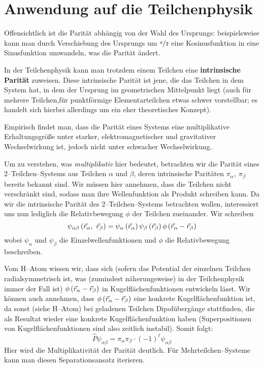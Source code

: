 \documentclass[Ex4_Zusammenfassung.tex]{subfiles}
\begin{document}
\section{Anwendung auf die Teilchenphysik}
Offensichtlich ist die Parität abhängig von der Wahl des Ursprungs: beispielsweise kann man durch Verschiebung des Ursprungs um $\nicefrac{\pi}{2}$ eine Kosinusfunktion in eine Sinusfunktion umwandeln, was die Parität ändert. 

In der Teilchenphysik kann man trotzdem einem Teilchen eine \textbf{intrinsische Parität} zuweisen. Diese intrinsische Parität ist jene, die das Teilchen in dem System hat, in dem der Ursprung im geometrischen Mittelpunkt liegt (auch für mehrere Teilchen,für punktförmige Elementarteilchen etwas schwer vorstellbar; es handelt sich hierbei allerdings um ein eher theoretisches Konzept). 

Empirisch findet man, dass die Parität eines Systems eine multiplikative Erhaltungsgröße unter starker, elektromagnetischer und gravitativer Wechselwirkung ist, jedoch nicht unter schwacher Wechselwirkung. 

Um zu verstehen, was \textit{multiplikativ} hier bedeutet, betrachten wir die Parität eines 2--Teilchen--Systems aus Teilchen $\alpha$ und $\beta$, deren intrinsische Paritäten $\pi_\alpha,\ \pi_\beta$ bereits bekannt sind. Wir müssen hier annehmen, dass die Teilchen nicht verschränkt sind, sodass man ihre Wellenfunktion als Produkt schreiben kann. Da wir die intrinsische Parität des 2--Teilchen--Systems betrachten wollen, interessiert uns nun lediglich die Relativbewegung $\phi$ der Teilchen zueinander. Wir schreiben
\begin{equation}
	\psi_{\alpha \beta} \lp \vec{r}_\alpha ,\ \vec{r}_\beta \rp = \psi_\alpha \lp \vec{r}_\alpha \rp \psi_\beta \lp \vec{r}_\beta \rp \phi \lp \vec{r}_\alpha - \vec{r}_\beta\rp
\end{equation}
wobei $\psi_\alpha$ und $\psi_\beta$ die Einzelwellenfunktionen und $\phi$ die Relativbewegung beschreiben. 

Vom H--Atom wissen wir, dass sich (sofern das Potential der einzelnen Teilchen radialsymmetrisch ist, was (zumindest näherungsweise) in der Teilchenphysik immer der Fall ist) $\phi \left( \vec{r}_\alpha - \vec{r}_\beta\right)$ in Kugelflächenfunktionen entwickeln lässt. Wir können auch annehmen, dass $\phi \left( \vec{r}_\alpha - \vec{r}_\beta\right)$ eine konkrete Kugelflächenfunktion ist, da sonst (siehe H--Atom) bei geladenen Teilchen Dipolübergänge stattfinden, die als Resultat wieder eine konkrete Kugelflächenfunktion haben (Superpositionen von Kugelflächenfunktionen sind also zeitlich instabil). Somit folgt:
\begin{equation}
	\hat{P}\psi_{\alpha \beta} = \pi_\alpha \pi_\beta \cdot (-1)^\ell \psi_{\alpha \beta}
\end{equation}
Hier wird die Multiplikativität der Parität deutlich. Für Mehrteilchen--Systeme kann man diesen Separationsansatz iterieren. 
\end{document}
